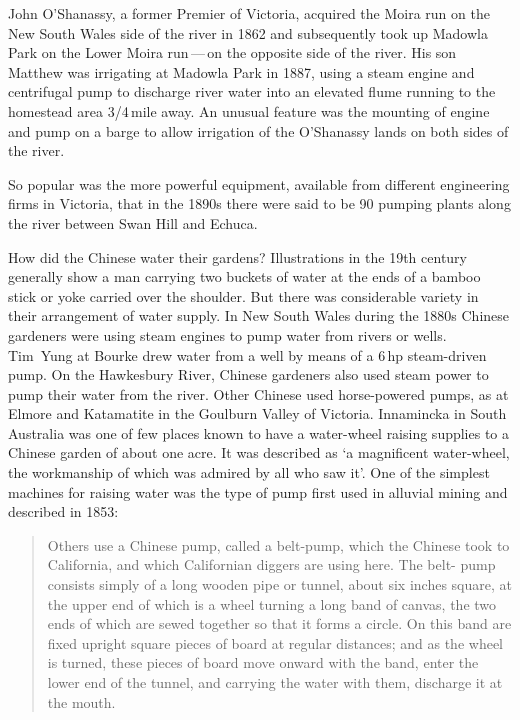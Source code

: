 John O'Shanassy, a former Premier of Victoria, acquired the Moira run
on the New South Wales side of the river in 1862 and subsequently took
up Madowla Park on the Lower Moira run\,---\,on the opposite side of the
river.  His son Matthew was irrigating at Madowla Park in 1887, using
a steam engine and centrifugal pump to discharge river water into an
elevated flume running to the homestead area 3/4\,mile away. An
unusual feature was the mounting of engine and pump on a barge to
allow irrigation of the O'Shanassy lands on both sides of the
river.

So popular was the more powerful equipment, available from different
engineering firms in Victoria, that in the 1890s there were said to be
90 pumping plants along the river between Swan Hill and
Echuca.

How did the Chinese water their gardens?  Illustrations in the 19th
century generally show a man carrying two buckets of water at the ends
of a bamboo stick or yoke carried over the shoulder.  But there was
considerable variety in their arrangement of water supply.  In New
South Wales during the 1880s Chinese gardeners were using steam
engines to pump water from rivers or wells.  Tim~Yung at Bourke drew
water from a well by means of a 6\,hp steam-driven pump.  On the
Hawkesbury River, Chinese gardeners also used steam power to pump
their water from the river.  Other Chinese used horse-powered pumps,
as at Elmore and Katamatite in the Goulburn Valley of Victoria.
Innamincka in South Australia was one of few places known to have a
water-wheel raising supplies to a Chinese garden of about one acre.
It was described as `a magnificent water-wheel, the workmanship of
which was admired by all who saw it'.  One of the simplest machines for
raising water was the type of pump first used in alluvial mining and
described in 1853:
\begin{quote}	
	Others use a Chinese pump, called a belt-pump, which the
	Chinese took to California, and which Californian diggers are
	using here.  The belt- pump consists simply of a long wooden
	pipe or tunnel, about six inches square, at the upper end of
	which is a wheel turning a long band of canvas, the two ends
	of which are sewed together so that it forms a circle.  On
	this band are fixed upright square pieces of board at regular
	distances; and as the wheel is turned, these pieces of board
	move onward with the band, enter the lower end of the tunnel,
	and carrying the water with them, discharge it at the
	mouth.
\end{quote}

